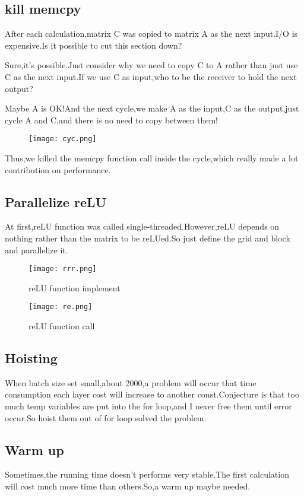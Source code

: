 \documentclass[12pt]{scrartcl} %
\begin{document}
\subsection{kill memcpy}
After each calculation,matrix C was copied to matrix A as the next input.I/O is expensive.Is it possible to cut this section down?

Sure,it's possible.Just consider why we need to copy C to A rather than just use C as the next input.If we use C as input,who to be the receiver to hold the next output?

Maybe A is OK!And the next cycle,we make A as the input,C as the output,just cycle A and C,and there is no need to copy between them!
\begin{figure}[H]
    \centering
    \texttt{[image: cyc.png]}
\end{figure}
Thus,we killed the memcpy function call inside the cycle,which really made a lot contribution on performance.

\subsection{Parallelize reLU}
At first,reLU function was called single-threaded.However,reLU depends on nothing rather than the matrix to be reLUed.So just define the grid and block and parallelize it.
\begin{figure}[H]
    \centering
    \texttt{[image: rrr.png]}
    \caption{reLU function implement}
\end{figure}
\begin{figure}[H]
    \centering
    \texttt{[image: re.png]}
    \caption{reLU function call}
\end{figure}
\subsection{Hoisting}
When batch size set small,about 2000,a problem will occur that time consumption each layer cost will increase to another const.Conjecture is that too much temp variables are put into the for loop,and I never free them until error occur.So hoist them out of for loop solved the problem.
\subsection{Warm up}
Sometimes,the running time doesn't performs very stable.The first calculation will cost much more time than others.So,a warm up maybe needed.
\end{document}
